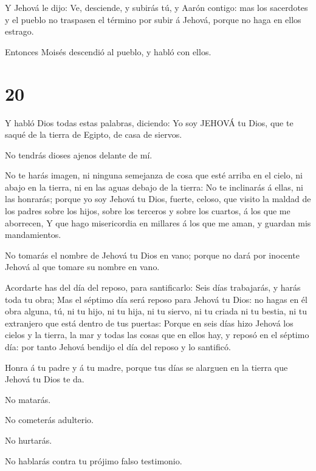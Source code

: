 Y Jehová le dijo: Ve, desciende, y subirás tú, y Aarón
contigo: mas los sacerdotes y el pueblo no traspasen el término por
subir á Jehová, porque no haga en ellos estrago.

 Entonces Moisés descendió al pueblo, y habló con ellos.

\hypertarget{section-19}{%
\section{20}\label{section-19}}

 Y habló Dios todas estas palabras, diciendo: 
Yo soy JEHOVÁ tu Dios, que te saqué de la tierra de Egipto, de casa de
siervos.

 No tendrás dioses ajenos delante de mí.

 No te harás imagen, ni ninguna semejanza de cosa que esté
arriba en el cielo, ni abajo en la tierra, ni en las aguas debajo de la
tierra:  No te inclinarás á ellas, ni las honrarás; porque
yo soy Jehová tu Dios, fuerte, celoso, que visito la maldad de los
padres sobre los hijos, sobre los terceros y sobre los cuartos, á los
que me aborrecen,  Y que hago misericordia en millares á los
que me aman, y guardan mis mandamientos.

 No tomarás el nombre de Jehová tu Dios en vano; porque no
dará por inocente Jehová al que tomare su nombre en vano.

 Acordarte has del día del reposo, para santificarlo:
 Seis días trabajarás, y harás toda tu obra; 
Mas el séptimo día será reposo para Jehová tu Dios: no hagas en él obra
alguna, tú, ni tu hijo, ni tu hija, ni tu siervo, ni tu criada ni tu
bestia, ni tu extranjero que está dentro de tus puertas: 
Porque en seis días hizo Jehová los cielos y la tierra, la mar y todas
las cosas que en ellos hay, y reposó en el séptimo día: por tanto Jehová
bendijo el día del reposo y lo santificó.

 Honra á tu padre y á tu madre, porque tus días se alarguen
en la tierra que Jehová tu Dios te da.

 No matarás.

 No cometerás adulterio.

 No hurtarás.

 No hablarás contra tu prójimo falso testimonio.

